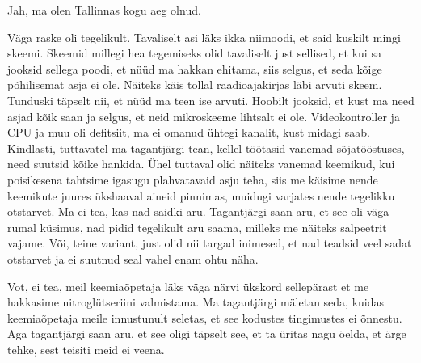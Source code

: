 Jah, ma olen Tallinnas kogu aeg olnud. 


Väga raske oli tegelikult. Tavaliselt asi läks ikka niimoodi, et said kuskilt 
mingi skeemi. Skeemid millegi hea tegemiseks olid tavaliselt just sellised, et 
kui sa jooksid sellega poodi, et nüüd ma hakkan  ehitama, siis selgus, et seda 
kõige põhilisemat asja ei ole. Näiteks käis tollal 
raadioajakirjas läbi arvuti skeem. 
Tunduski täpselt nii, et  nüüd ma teen ise arvuti. Hoobilt jooksid, et kust ma 
need asjad kõik saan ja selgus, et neid mikroskeeme lihtsalt ei ole. 
Videokontroller ja CPU ja muu oli defitsiit, ma ei omanud ühtegi kanalit, kust 
midagi saab. Kindlasti, tuttavatel ma tagantjärgi tean, kellel töötasid  
vanemad sõjatööstuses, need suutsid kõike hankida. Ühel tuttaval olid näiteks 
vanemad keemikud,  kui poisikesena tahtsime igasugu plahvatavaid asju teha, 
siis me käisime nende keemikute juures ükshaaval aineid pinnimas, muidugi 
varjates nende tegelikku otstarvet. Ma ei tea, kas nad saidki aru. Tagantjärgi 
saan aru, et see oli väga rumal küsimus, nad pidid tegelikult aru saama, 
milleks me  näiteks salpeetrit vajame. Või, teine variant, just olid nii targad 
inimesed, et nad teadsid veel sadat otstarvet ja ei suutnud seal vahel enam 
ohtu näha. 


Vot, ei tea, meil keemiaõpetaja läks väga närvi ükskord sellepärast et me 
hakkasime nitroglütseriini valmistama. Ma tagantjärgi mäletan seda, kuidas keemiaõpetaja meile 
innustunult seletas, et see kodustes tingimustes ei õnnestu. Aga tagantjärgi 
saan aru, et see oligi täpselt see, et ta üritas nagu öelda, et ärge tehke, 
sest teisiti meid ei veena. 


